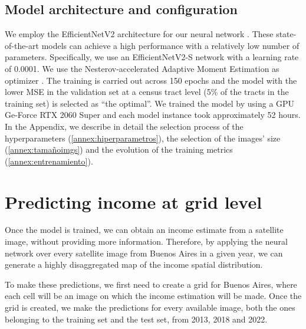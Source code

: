 \documentclass[conference]{IEEEtran}
\begin{document}


\subsection{Model architecture and configuration} \label{sec:arquitectura}

We employ the EfficientNetV2 architecture for our neural network \citep{EfficientNetV2}. These state-of-the-art models can achieve a high performance with a relatively low number of parameters. Specifically, we use an EfficientNetV2-S network with a learning rate of 0.0001. We use the Nesterov-accelerated Adaptive Moment Estimation as optimizer \citep{dozat_nadam}. The training is carried out across 150 epochs and the model with the lower MSE in the validation set at a census tract level (5\% of the tracts in the training set)  is selected as ``the optimal''. We trained the model by using a GPU Ge-Force RTX 2060 Super and each model instance took approximately 52 hours. In the Appendix, we describe in detail the selection process of the hyperparameters (\ref{annex:hiperparametros}), the selection of the images’ size (\ref{annex:tamañoimgs}) and the evolution of the training metrics (\ref{annex:entrenamiento}).

\section{Predicting income at grid level}\label{sec:grilla}

Once the model is trained, we can obtain an income estimate from a satellite image, without providing more information. Therefore, by applying the neural network over every satellite image from Buenos Aires in a given year, we can generate a highly disaggregated map of the income spatial distribution.

To make these predictions, we first need to create a grid for Buenos Aires, where each cell will be an image on which the income estimation will be made. Once the grid is created, we make the predictions for every available image, both the ones belonging to the training set and the test set, from 2013, 2018 and 2022.
\end{document}
